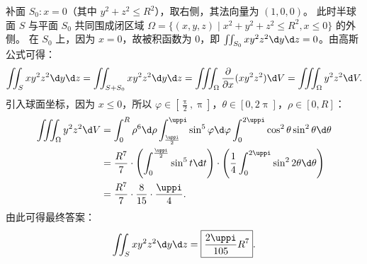 \begin{solution}

    补面 $S_0: x = 0$（其中 $y^2 + z^2 \le R^2$），取右侧，其法向量为 $(1, 0, 0)$。
    此时半球面 $S$ 与平面 $S_0$ 共同围成闭区域 $\Omega = \{ (x, y, z) \mid x^2 + y^2 + z^2 \le R^2, x \le 0 \}$ 的外侧。
    在 $S_0$ 上，因为 $x = 0$，故被积函数为 $0$，即 $\iint_{S_0} x y^2 z^2 \d y \d z = 0$。由高斯公式可得：
    \begin{equation}
        \label{eq:hemisphere-left-1}
        \iint_{S} x y^2 z^2 \d y \d z = \iint_{S + S_0} x y^2 z^2 \d y \d z = \iiint_{\Omega} \frac{\partial}{\partial x} (x y^2 z^2) \d V = \iiint_{\Omega} y^2 z^2 \d V.
    \end{equation}
    引入球面坐标，因为 $x \le 0$，所以 $\varphi \in \left[ \frac{\uppi}{2}, \uppi \right]$，$\theta \in [0, 2\uppi]$，$\rho \in [0, R]$：
    \begin{equation}
        \label{eq:hemisphere-left-2}
        \begin{aligned}
            \iiint_{\Omega} y^2 z^2 \d V & = \int_0^R \rho^6 \d \rho \int_{\frac{\uppi}{2}}^{\uppi} \sin^5 \varphi \d \varphi \int_0^{2\uppi} \cos^2 \theta \sin^2 \theta \d \theta              \\
                                         & = \frac{R^7}{7} \cdot \left( \int_0^{\frac{\uppi}{2}} \sin^5 t \d t \right) \cdot \left( \frac{1}{4} \int_0^{2\uppi} \sin^2 2\theta \d \theta \right) \\
                                         & = \frac{R^7}{7} \cdot \frac{8}{15} \cdot \frac{\uppi}{4}.
        \end{aligned}
    \end{equation}
    由此可得最终答案：
    \begin{equation}
        \label{eq:hemisphere-left-3}
        \iint_{S} x y^2 z^2 \d y \d z = \boxed{\frac{2 \uppi}{105} R^7}.
    \end{equation}



\end{solution}
